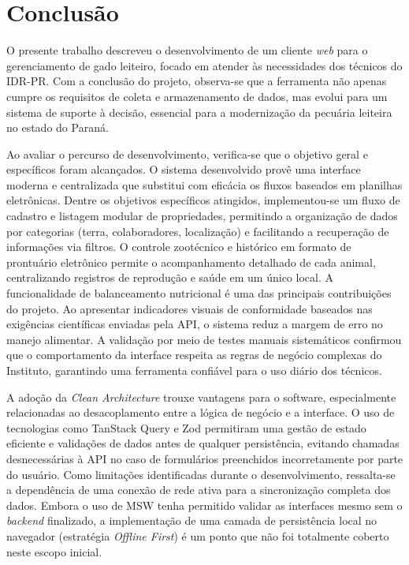 \chapter{Conclusão}\label{cap:conclusao}

O presente trabalho descreveu o desenvolvimento de um cliente \textit{web} para o gerenciamento de gado leiteiro, focado em atender às necessidades dos técnicos do \gls{IDR-PR}. Com a conclusão do projeto, observa-se que a ferramenta não apenas cumpre os requisitos de coleta e armazenamento de dados, mas evolui para um sistema de suporte à decisão, essencial para a modernização da pecuária leiteira no estado do Paraná.

Ao avaliar o percurso de desenvolvimento, verifica-se que o objetivo geral e específicos foram alcançados. O sistema desenvolvido provê uma interface moderna e centralizada que substitui com eficácia os fluxos baseados em planilhas eletrônicas. Dentre os objetivos específicos atingidos, implementou-se um fluxo de cadastro e listagem modular de propriedades, permitindo a organização de dados por categorias (terra, colaboradores, localização) e facilitando a recuperação de informações via filtros. O controle zootécnico e histórico em formato de prontuário eletrônico permite o acompanhamento detalhado de cada animal, centralizando registros de reprodução e saúde em um único local. A funcionalidade de balanceamento nutricional é uma das principais contribuições do projeto. Ao apresentar indicadores visuais de conformidade baseados nas exigências científicas enviadas pela \gls{API}, o sistema reduz a margem de erro no manejo alimentar. A validação por meio de testes manuais sistemáticos confirmou que o comportamento da interface respeita as regras de negócio complexas do Instituto, garantindo uma ferramenta confiável para o uso diário dos técnicos.

A adoção da \textit{Clean Architecture} trouxe vantagens para o software, especialmente relacionadas ao desacoplamento entre a lógica de negócio e a interface. O uso de tecnologias como TanStack Query e Zod permitiram uma gestão de estado eficiente e validações de dados antes de qualquer persistência, evitando chamadas desnecessárias à \gls{API} no caso de formulários preenchidos incorretamente por parte do usuário. Como limitações identificadas durante o desenvolvimento, ressalta-se a dependência de uma conexão de rede ativa para a sincronização completa dos dados. Embora o uso de \gls{MSW} tenha permitido validar as interfaces mesmo sem o \textit{backend} finalizado, a implementação de uma camada de persistência local no navegador (estratégia \textit{Offline First}) é um ponto que não foi totalmente coberto neste escopo inicial.

